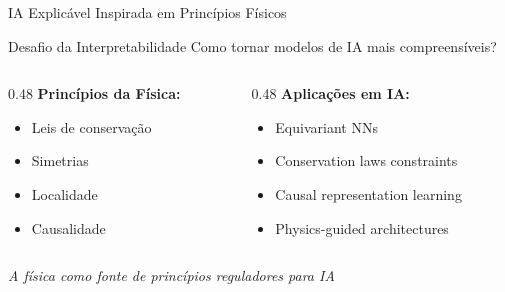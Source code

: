 \documentclass[aspectratio=169,12pt]{beamer}
\begin{document}
\begin{frame}{IA Explicável Inspirada em Princípios Físicos}
    \begin{block}{Desafio da Interpretabilidade}
        Como tornar modelos de IA mais compreensíveis?
    \end{block}

    \begin{columns}[T]
        \begin{column}{0.48\textwidth}
            \textbf{Princípios da Física:}
            \begin{itemize}
                \item Leis de conservação
                \item Simetrias
                \item Localidade
                \item Causalidade
            \end{itemize}
        \end{column}
        \begin{column}{0.48\textwidth}
            \textbf{Aplicações em IA:}
            \begin{itemize}
                \item Equivariant NNs
                \item Conservation laws constraints
                \item Causal representation learning
                \item Physics-guided architectures
            \end{itemize}
        \end{column}
    \end{columns}

    \vspace{0.5cm}

    \begin{center}
        \textit{A física como fonte de princípios reguladores para IA}
    \end{center}
\end{frame}
\end{document}
